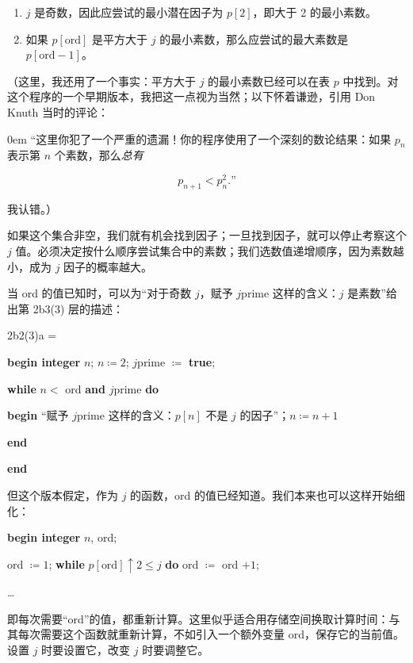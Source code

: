 \documentclass[twoside,11pt,fontset=none]{ctexbook}
\begin{document}
\begin{enumerate}[wide, nosep, label=(\arabic*)]
	\item $j$ 是奇数，因此应尝试的最小潜在因子为 $p[2]$，即大于 2 的最小素数。

	\item 如果 $p[\text{ord}]$ 是平方大于 $j$ 的最小素数，那么应尝试的最大素数是 $p[\text{ord} - 1]$。
\end{enumerate}

（这里，我还用了一个事实：平方大于 $j$ 的最小素数已经可以在表 $p$ 中找到。对这个程序的一个早期版本，我把这一点视为当然；以下怀着谦逊，引用 Don Knuth 当时的评论：

\begin{addmargin}[\parindent]{0em}
“这里你犯了一个严重的遗漏！你的程序使用了一个深刻的数论结果：如果 $p_n$ 表示第 $n$ 个素数，那么\textit{总有}
\end{addmargin}
$$
p_{n+1}<p_n^2.\text{”}
$$

\noindent
我认错。）

如果这个集合非空，我们就有机会找到因子；一旦找到因子，就可以停止考察这个 $j$ 值。必须决定按什么顺序尝试集合中的素数；我们选数值递增顺序，因为素数越小，成为 $j$ 因子的概率越大。

当 ord 的值已知时，可以为“对于奇数 $j$，赋予 $j$prime 这样的含义：$j$ 是素数”给出第 2b3(3) 层的描述：

\noindent
2b2(3)a =

\noindent
\textbf{begin integer} $n$; $n \coloneq 2$; $j$prime $\coloneq$ \textbf{true};

\noindent
\quad\textbf{while} $n <$ ord \textbf{and} $j$prime \textbf{do}

\noindent
\quad\textbf{begin} “赋予 $j$prime 这样的含义：$p[n]$ 不是 $j$ 的因子”；$n \coloneq n + 1$

\noindent
\quad\textbf{end}

\noindent
\textbf{end}

但这个版本假定，作为 $j$ 的函数，ord 的值已经知道。我们本来也可以这样开始细化：

\noindent
\textbf{begin integer} $n$, ord;

\noindent
\quad ord $\coloneq 1$; \textbf{while} $p[\text{ord}] \uparrow 2 \leqslant j$ \textbf{do} ord $\coloneq$ ord $+ 1$;

\noindent
\quad \dots

\noindent
即每次需要“ord”的值，都重新计算。这里似乎适合用存储空间换取计算时间：与其每次需要这个函数就重新计算，不如引入一个额外变量 ord，保存它的当前值。设置 $j$ 时要设置它，改变 $j$ 时要调整它。
\end{document}
